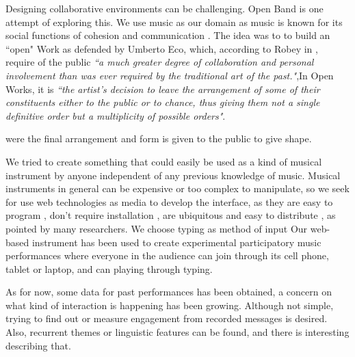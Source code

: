 \documentclass{aes2e}
\begin{document}
Designing collaborative environments can be challenging. Open Band is one attempt of exploring this. We use music as our domain as music is known for its social functions of cohesion and communication \cite{Koelsch:2014}. The idea was to to build an ``open" Work as defended by Umberto Eco\cite{eco_obra_2015}, which, according to Robey in \cite{eco_obra_2015}, require of the public \textit{``a much greater degree of collaboration and personal involvement than was ever required by the traditional art of the past."},In Open Works, it is \textit{``the artist's decision to leave the arrangement of some of their constituents either to the public or to chance, thus giving them not a single definitive order but a multiplicity of possible orders"}.

were the final arrangement and form is given to the public to give shape.

We tried to create something that could easily be used as a kind of musical instrument by anyone independent of any previous knowledge of music. Musical instruments in general can be expensive or too complex to manipulate, so we seek for use web technologies as media to develop the interface, as they are easy to program \cite{Roberts2013webbrowser}, don't require installation \cite{Wyse2013viability}, are ubiquitous and easy to distribute \cite{lee_web-based_2015}, as pointed by many researchers. We choose typing as method of input  Our web-based instrument has been used to create experimental participatory music performances where everyone in the audience can join through its cell phone, tablet or laptop, and can playing through typing. 

As for now, some data for past performances has been obtained, a concern on what kind of interaction is happening has been growing. Although not simple, trying to find out or measure engagement from recorded messages is desired. Also, recurrent themes or linguistic features can be found, and there is interesting describing that.

\end{document}
